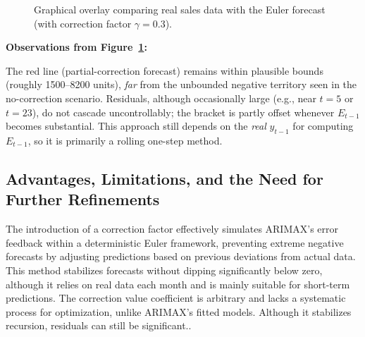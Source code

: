 \documentclass{article}
\begin{document}
\begin{figure}[H]
\centering
{}
\caption{Graphical overlay comparing real sales data with the Euler forecast (with correction factor \(\gamma=0.3\)).}
\label{fig:euler_corr_graph}
\end{figure}

\textbf{Observations from Figure~\ref{fig:euler_corr_graph}:}

 The red line (partial-correction forecast) remains within plausible bounds (roughly 1500--8200 units), \emph{far} from the unbounded negative territory seen in the no-correction scenario.
 Residuals, although occasionally large (e.g., near $t=5$ or $t=23$), do not cascade uncontrollably; the bracket is partly offset whenever $E_{t-1}$ becomes substantial.
 This approach still depends on the \emph{real} $y_{t-1}$ for computing $E_{t-1}$, so it is primarily a rolling one-step method.

\subsection{Advantages, Limitations, and the Need for Further Refinements}
The introduction of a correction factor effectively simulates ARIMAX's error feedback within a deterministic Euler framework, preventing extreme negative forecasts by adjusting predictions based on previous deviations from actual data. This method stabilizes forecasts without dipping significantly below zero, although it relies on real data each month and is mainly suitable for short-term predictions. The correction value coefficient is arbitrary and lacks a systematic process for optimization, unlike ARIMAX's fitted models. Although it stabilizes recursion, residuals can still be significant..
\end{document}
